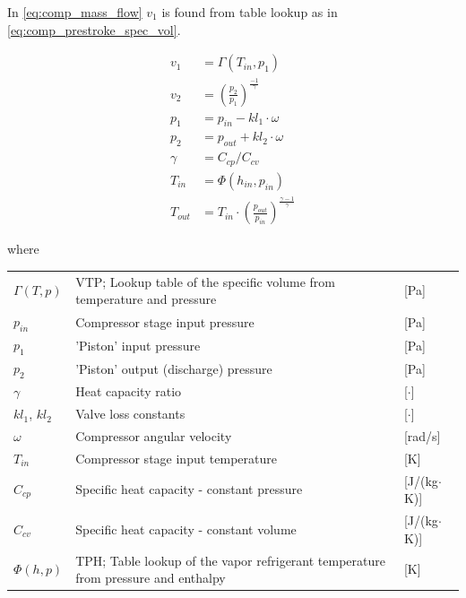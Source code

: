 In \cref{eq:comp_mass_flow} $v_1$ is found from table lookup as in \cref{eq:comp_prestroke_spec_vol}.

\begin{align}
	v_1 &= \Gamma(T_{in},p_{1}) \label{eq:comp_prestroke_spec_vol} \\
	v_2 &= \left(\frac{p_2}{p_1}\right)^{\frac{-1}{\gamma}} \\
	p_1 &= p_{in} - kl_1 \cdot \omega \\
	p_2 &= p_{out} + kl_2 \cdot \omega \\
	\gamma &= C_{cp}/C_{cv} \\
	T_{in} &= \Phi(h_{in}, p_{in})  \\
	T_{out} &= T_{in}\cdot \left(\frac{p_{out}}{p_{in}}\right)^{\frac{\gamma-1}{\gamma}}
\end{align}

where

\begin{center}
	\begin{tabular}{l p{8cm} l}
		$\Gamma(T,p)$   & VTP; Lookup table of the specific volume from temperature and pressure & [\si{Pa}]                         \\
		$p_{in}$        & Compressor stage input pressure                                        & [\si{Pa}]                         \\
		$p_1$           & 'Piston' input pressure                                                  & [\si{Pa}]                         \\
		$p_2$           & 'Piston' output (discharge) pressure                                     & [\si{Pa}]                         \\
		$\gamma$        & Heat capacity ratio                                                    & [$ \cdot $]                       \\
		$ kl_1$, $kl_2$ & Valve loss constants                                                   & [$ \cdot $]                       \\
		$\omega$        & Compressor angular velocity                                            & [\si{rad}/\si{s}]                 \\
		$T_{in}$        & Compressor stage input temperature                                     & [\si{K}]                          \\
		$C_{cp}$        & Specific heat capacity - constant pressure                             & [\si{J}/(\si{kg}$ \cdot $\si{K})] \\
		$C_{cv} $       & Specific heat capacity - constant volume                               & [\si{J}/(\si{kg}$ \cdot $\si{K})] \\
		$\Phi(h,p)$ 	& TPH; Table lookup of the vapor refrigerant temperature from pressure and enthalpy & [\si{K}]
	\end{tabular}
\end{center}


